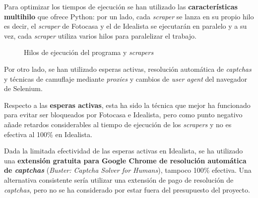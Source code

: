 \documentclass[12pt]{article}
\begin{document}
Para optimizar los tiempos de ejecución se han utilizado las \textbf{características multihilo} que ofrece Python: por un lado, cada \textit{scraper} se lanza en su propio hilo \textemdash es decir, el \textit{scraper} de Fotocasa y el de Idealista se ejecutarán en paralelo \textemdash y a su vez, cada \textit{scraper} utiliza varios hilos para paralelizar el trabajo.

\begin{figure}[h]
	\centering
	\caption{\vspace{1.5em}Hilos de ejecución del programa y \textit{scrapers}}
	\vspace{-2em}
\end{figure}

Por otro lado, se han utilizado esperas activas, resolución automática de \textit{captchas} y técnicas de camuflaje mediante \textit{proxies} y cambios de \textit{user agent} del navegador de Selenium.

\newpage
Respecto a las \textbf{esperas activas}, esta ha sido la técnica que mejor ha funcionado para evitar ser bloqueados por Fotocasa e Idealista, pero como punto negativo añade retardos considerables al tiempo de ejecución de los \textit{scrapers} y no es efectiva al 100\% en Idealista.

Dada la limitada efectividad de las esperas activas en Idealista, se ha utilizado una \textbf{extensión gratuita para Google Chrome de resolución automática de \textit{captchas}} (\textit{Buster: Captcha Solver for Humans}), tampoco 100\% efectiva. Una alternativa consistente sería utilizar una extensión de pago de resolución de \textit{captchas}, pero no se ha considerado por estar fuera del presupuesto del proyecto.
\end{document}
